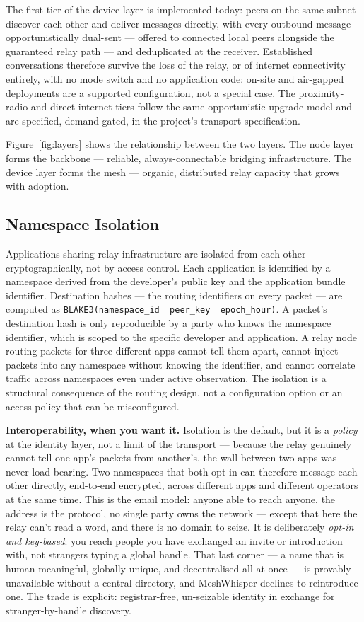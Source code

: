 \documentclass[11pt, a4paper]{article}
\begin{document}
The first tier of the device layer is implemented today: peers on the same subnet discover each other and deliver messages directly, with every outbound message opportunistically dual-sent — offered to connected local peers alongside the guaranteed relay path — and deduplicated at the receiver. Established conversations therefore survive the loss of the relay, or of internet connectivity entirely, with no mode switch and no application code: on-site and air-gapped deployments are a supported configuration, not a special case. The proximity-radio and direct-internet tiers follow the same opportunistic-upgrade model and are specified, demand-gated, in the project's transport specification.

Figure~\ref{fig:layers} shows the relationship between the two layers. The node layer forms the backbone — reliable, always-connectable bridging infrastructure. The device layer forms the mesh — organic, distributed relay capacity that grows with adoption.

\subsection{Namespace Isolation}

Applications sharing relay infrastructure are isolated from each other cryptographically, not by access control. Each application is identified by a namespace derived from the developer's public key and the application bundle identifier. Destination hashes — the routing identifiers on every packet — are computed as \texttt{BLAKE3(namespace\_id \textbar\textbar\ peer\_key \textbar\textbar\ epoch\_hour)}. A packet's destination hash is only reproducible by a party who knows the namespace identifier, which is scoped to the specific developer and application. A relay node routing packets for three different apps cannot tell them apart, cannot inject packets into any namespace without knowing the identifier, and cannot correlate traffic across namespaces even under active observation. The isolation is a structural consequence of the routing design, not a configuration option or an access policy that can be misconfigured.

\textbf{Interoperability, when you want it.} Isolation is the default, but it is a \emph{policy} at the identity layer, not a limit of the transport — because the relay genuinely cannot tell one app's packets from another's, the wall between two apps was never load-bearing. Two namespaces that both opt in can therefore message each other directly, end-to-end encrypted, across different apps and different operators at the same time. This is the email model: anyone able to reach anyone, the address is the protocol, no single party owns the network — except that here the relay can't read a word, and there is no domain to seize. It is deliberately \emph{opt-in and key-based}: you reach people you have exchanged an invite or introduction with, not strangers typing a global handle. That last corner --- a name that is human-meaningful, globally unique, and decentralised all at once --- is provably unavailable without a central directory, and MeshWhisper declines to reintroduce one. The trade is explicit: registrar-free, un-seizable identity in exchange for stranger-by-handle discovery.
\end{document}
